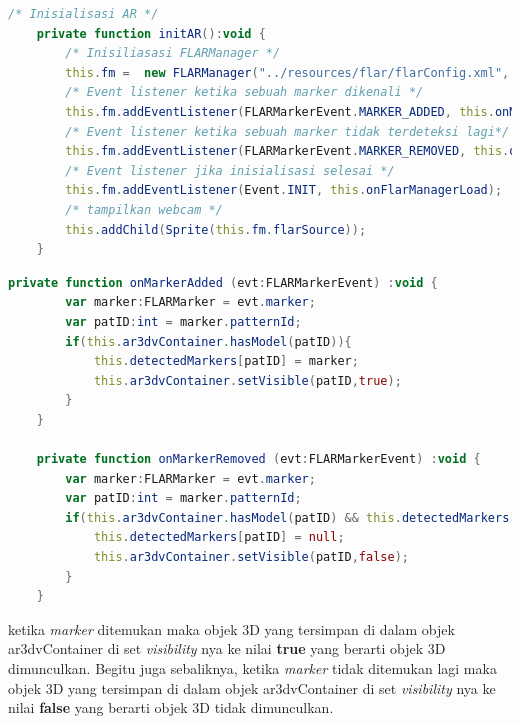 \begin{lstlisting}[language=ActionScript,caption=Init AR,label=code:init-ar]
	/* Inisialisasi AR */
	private function initAR():void {
		/* Inisiliasasi FLARManager */
		this.fm =  new FLARManager("../resources/flar/flarConfig.xml", new FLARToolkitManager(), this.stage);
		/* Event listener ketika sebuah marker dikenali */
		this.fm.addEventListener(FLARMarkerEvent.MARKER_ADDED, this.onMarkerAdded);
		/* Event listener ketika sebuah marker tidak terdeteksi lagi*/
		this.fm.addEventListener(FLARMarkerEvent.MARKER_REMOVED, this.onMarkerRemoved);
		/* Event listener jika inisialisasi selesai */
		this.fm.addEventListener(Event.INIT, this.onFlarManagerLoad);
		/* tampilkan webcam */
		this.addChild(Sprite(this.fm.flarSource));
	}
\end{lstlisting}


\begin{lstlisting}[language=ActionScript,caption=Marker,label=code:marker]
private function onMarkerAdded (evt:FLARMarkerEvent) :void {
		var marker:FLARMarker = evt.marker;
		var patID:int = marker.patternId;
		if(this.ar3dvContainer.hasModel(patID)){
			this.detectedMarkers[patID] = marker;
			this.ar3dvContainer.setVisible(patID,true);
		}
	}
	
	private function onMarkerRemoved (evt:FLARMarkerEvent) :void {
		var marker:FLARMarker = evt.marker;
		var patID:int = marker.patternId;
		if(this.ar3dvContainer.hasModel(patID) && this.detectedMarkers[patID] != null){
			this.detectedMarkers[patID] = null;
			this.ar3dvContainer.setVisible(patID,false);
		}
	}
\end{lstlisting}

ketika \textit{marker} ditemukan maka objek 3D yang tersimpan di dalam objek ar3dvContainer di set \textit{visibility} nya ke nilai \textbf{true} yang berarti objek 3D dimunculkan. Begitu juga sebaliknya, ketika \textit{marker} tidak ditemukan lagi maka objek 3D yang tersimpan di dalam objek ar3dvContainer di set \textit{visibility} nya ke nilai \textbf{false} yang berarti objek 3D tidak dimunculkan.

